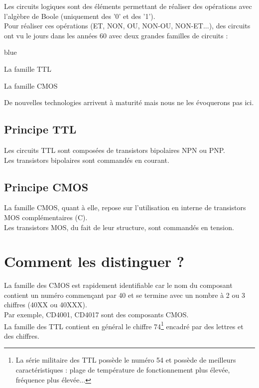 Les circuits logiques sont des éléments permettant de réaliser des opérations avec l'algèbre de Boole 
(uniquement des '0' et des '1').\\
Pour réaliser ces opérations (ET, NON, OU, NON-OU, NON-ET...), des circuits ont vu le jours dans les années 60 avec deux grandes familles de circuits : \\
\begin{items}{blue}{\Triangle}
    \item La famille TTL 
    \item La famille CMOS 
\end{items} 


De nouvelles technologies arrivent à maturité mais nous ne les évoquerons pas ici.

\subsection{Principe TTL}

Les circuits TTL sont composées de transistors bipolaires NPN ou PNP. \\
Les transistors bipolaires sont commandés en courant.


\subsection{Principe CMOS}

La famille CMOS, quant à elle, repose sur l'utilisation en interne de transistors MOS complémentaires (C). \\
Les transistors MOS, du fait de leur structure, sont commandés en tension.


\section{Comment les distinguer ?}

La famille des CMOS est rapidement identifiable car le nom du composant contient un numéro commençant par 40 et se termine avec un nombre à 2 ou 3 chiffres (40XX ou 40XXX). \\

Par exemple, CD4001, CD4017 sont des composants CMOS. \\



La famille des TTL contient en général le chiffre 74\footnote{La série militaire des TTL possède le numéro 54 et possède de meilleurs caractéristiques : plage de température de fonctionnement plus élevée, fréquence plus élevée...} encadré par des lettres et des chiffres. \\





